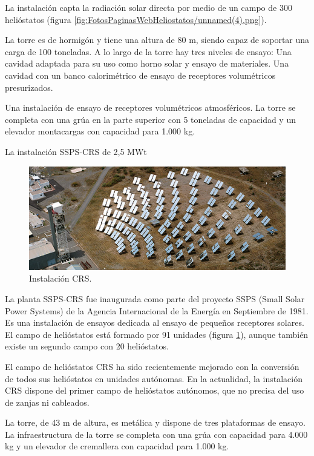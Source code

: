 La instalación capta la radiación solar directa por medio de un campo de 300 helióstatos (figura \ref{fig:FotosPaginasWebHeliostatos/unnamed(4).png}).

La torre es de hormigón y tiene una altura de 80 m, siendo capaz de soportar una carga de 100 toneladas. A lo largo de la torre hay tres niveles de ensayo:
Una cavidad adaptada para su uso como horno solar y ensayo de materiales.
Una cavidad con un banco calorimétrico de ensayo de receptores volumétricos presurizados.

Una instalación de ensayo de receptores volumétricos atmosféricos.
La torre se completa con una grúa en la parte superior con 5 toneladas de capacidad y un elevador montacargas con capacidad para 1.000 kg. \cite{PSA3WebSite}



La instalación SSPS-CRS de 2,5 MWt

\begin{figure}[h!]
  	\centering
	\includegraphics[width=\textwidth]{FotosPaginasWebHeliostatos/unnamed(6).png}
	\caption{Instalación CRS.~\cite{PSA2WebSite}
	\label{fig:FotosPaginasWebHeliostatos/unnamed(6).png}}
\end{figure}

La planta SSPS-CRS fue inaugurada como parte del proyecto SSPS (Small Solar Power Systems) de la Agencia Internacional de la Energía en Septiembre de 1981.
Es una instalación de ensayos dedicada al ensayo de pequeños receptores solares. El campo de helióstatos está formado por 91 unidades (figura \ref{fig:FotosPaginasWebHeliostatos/unnamed(6).png}), aunque también existe un segundo campo con 20 helióstatos.

El campo de helióstatos CRS ha sido recientemente mejorado con la conversión de todos sus helióstatos en unidades autónomas. En la actualidad, la instalación CRS dispone del primer campo de helióstatos autónomos, que no precisa del uso de zanjas ni cableados.

La torre, de 43 m de altura, es metálica y dispone de tres plataformas de ensayo.
La infraestructura de la torre se completa con una grúa con capacidad para 4.000 kg y un elevador de cremallera con capacidad para 1.000 kg.

